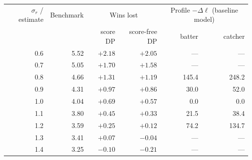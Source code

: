 \begin{tabular}{rrrrrr}
\toprule
$\sigma_r$ / estimate & Benchmark & \multicolumn{2}{c}{Wins lost} & \multicolumn{2}{c}{Profile $-\Delta\ell$ (baseline model)} \\
& & score DP & score-free DP & batter & catcher \\
\midrule
0.6 & 5.52 & $+2.18$ & $+2.05$ & --- & --- \\
0.7 & 5.05 & $+1.70$ & $+1.58$ & --- & --- \\
0.8 & 4.66 & $+1.31$ & $+1.19$ & 145.4 & 248.2 \\
0.9 & 4.31 & $+0.97$ & $+0.86$ & 30.0 & 52.0 \\
1.0 & 4.04 & $+0.69$ & $+0.57$ & 0.0 & 0.0 \\
1.1 & 3.80 & $+0.45$ & $+0.33$ & 21.5 & 38.4 \\
1.2 & 3.59 & $+0.25$ & $+0.12$ & 74.2 & 134.7 \\
1.3 & 3.41 & $+0.07$ & $-0.04$ & --- & --- \\
1.4 & 3.25 & $-0.10$ & $-0.21$ & --- & --- \\
\bottomrule
\end{tabular}
